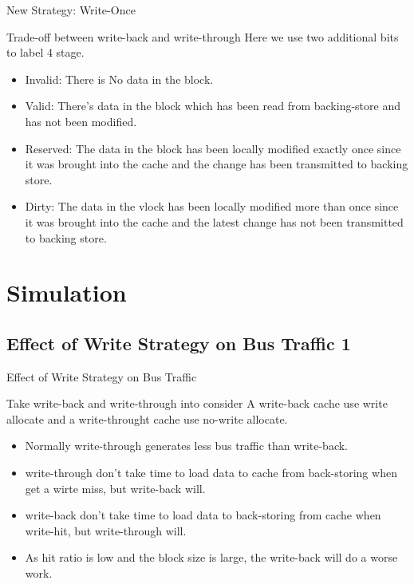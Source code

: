 \documentclass{beamer}
\begin{document}
\begin{frame}{New Strategy: Write-Once}
	\begin{block}{Trade-off between write-back and write-through}
		Here we use two additional bits to label 4 stage.
	\begin{itemize}
		\item {Invalid:  There is No data in the block.
			}
		\item{Valid: There's data in the block which has been read from backing-store and has not been modified.
		}
		\item{Reserved: The data in the block has been locally modified exactly once since it was brought into the cache and the change has been transmitted to backing store.}
		\item{Dirty: The data in the vlock has been locally modified more than once since it was brought into the cache and the latest change has not been transmitted to backing store.
		}
	\end{itemize}
	\end{block}
\end{frame}

\section{Simulation}
\subsection{Effect of Write Strategy on Bus Traffic 1}
\begin{frame}{Effect of Write Strategy on Bus Traffic}
	\begin{block}{Take write-back and write-through into consider}
		A write-back cache use write allocate and a write-throught cache use no-write allocate.
	\end{block}
	\begin{itemize}
		\item{Normally write-through generates less bus traffic than write-back.}
		\item{write-through don't take time to load data to cache from back-storing when get a wirte miss, but write-back will.}
		\item{write-back don't take time to load data to back-storing from cache when write-hit, but write-through will.}
		\item{As hit ratio is low and the block size is large, the write-back will do a worse work.}
	\end{itemize}
\end{frame}
\end{document}
